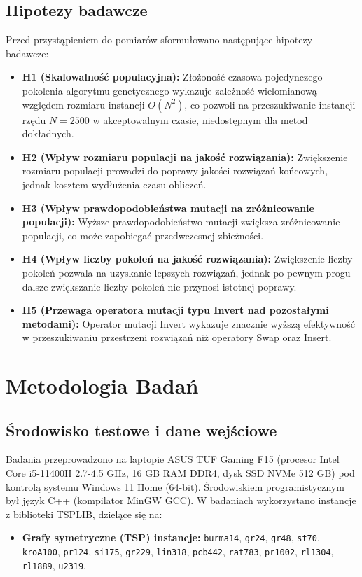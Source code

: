 \documentclass[conference]{IEEEtran}
\begin{document}
        \subsection{Hipotezy badawcze}
            Przed przystąpieniem do pomiarów sformułowano następujące hipotezy badawcze:
        \begin{itemize}
            \item \textbf{H1 (Skalowalność populacyjna):} Złożoność czasowa pojedynczego pokolenia algorytmu genetycznego wykazuje zależność wielomianową względem rozmiaru instancji $O(N^2)$, co pozwoli na przeszukiwanie instancji rzędu $N=2500$ w akceptowalnym czasie, niedostępnym dla metod dokładnych.
            \item \textbf{H2 (Wpływ rozmiaru populacji na jakość rozwiązania):} Zwiększenie rozmiaru populacji prowadzi do poprawy jakości rozwiązań końcowych, jednak kosztem wydłużenia czasu obliczeń.
            \item \textbf{H3 (Wpływ prawdopodobieństwa mutacji na zróżnicowanie populacji):} Wyższe prawdopodobieństwo mutacji zwiększa zróżnicowanie populacji, co może zapobiegać przedwczesnej zbieżności.
            \item \textbf{H4 (Wpływ liczby pokoleń na jakość rozwiązania):} Zwiększenie liczby pokoleń pozwala na uzyskanie lepszych rozwiązań, jednak po pewnym progu dalsze zwiększanie liczby pokoleń nie przynosi istotnej poprawy.
            \item \textbf{H5 (Przewaga operatora mutacji typu Invert nad pozostałymi metodami):} Operator mutacji Invert wykazuje znacznie wyższą efektywność w przeszukiwaniu przestrzeni rozwiązań niż operatory Swap oraz Insert.
        \end{itemize}


    \section{Metodologia Badań}
        \subsection{Środowisko testowe i dane wejściowe}
            Badania przeprowadzono na laptopie ASUS TUF Gaming F15 (procesor Intel Core i5-11400H 2.7-4.5 GHz, 16 GB RAM DDR4, dysk SSD NVMe 512 GB) pod kontrolą systemu Windows 11 Home (64-bit). Środowiskiem programistycznym był język C++ (kompilator MinGW GCC). 
            W badaniach wykorzystano instancje z biblioteki TSPLIB, dzielące się na:
            \begin{itemize}
                \item \textbf{Grafy symetryczne (TSP) instancje:} \texttt{burma14}, \texttt{gr24}, \texttt{gr48}, \texttt{st70}, \texttt{kroA100}, \texttt{pr124}, \texttt{si175}, \texttt{gr229}, \texttt{lin318}, \texttt{pcb442}, \texttt{rat783}, \texttt{pr1002}, \texttt{rl1304}, \texttt{rl1889}, \texttt{u2319}.
            \end{itemize}
\end{document}
